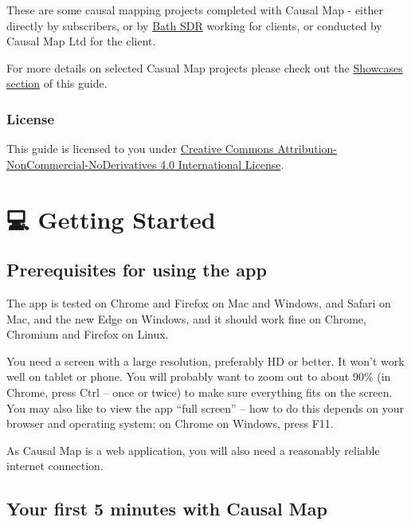 \documentclass[
]{book}
\begin{document}
These are some causal mapping projects completed with Causal Map - either directly by subscribers, or by \href{https://bathsdr.org}{Bath SDR} working for clients, or conducted by Causal Map Ltd for the client.

For more details on selected Casual Map projects please check out the \protect\hyperlink{xshowcases}{Showcases section} of this guide.

\hypertarget{license}{%
\section*{License}\label{license}}

This guide is licensed to you under \href{http://creativecommons.org/licenses/by-nc-nd/4.0/}{Creative Commons Attribution-NonCommercial-NoDerivatives 4.0 International License}.

\hypertarget{part-getting-started}{%
\part{💻 Getting Started}\label{part-getting-started}}

\hypertarget{prerequisites-for-using-the-app}{%
\chapter{Prerequisites for using the app}\label{prerequisites-for-using-the-app}}

The app is tested on Chrome and Firefox on Mac and Windows, and Safari on Mac, and the new Edge on Windows, and it should work fine on Chrome, Chromium and Firefox on Linux.

You need a screen with a large resolution, preferably HD or better. It won't work well on tablet or phone. You will probably want to zoom out to about 90\% (in Chrome, press Ctrl -- once or twice) to make sure everything fits on the screen. You may also like to view the app ``full screen'' -- how to do this depends on your browser and operating system; on Chrome on Windows, press F11.

As Causal Map is a web application, you will also need a reasonably reliable internet connection.

\hypertarget{x5}{%
\chapter{Your first 5 minutes with Causal Map}\label{x5}}
\end{document}
